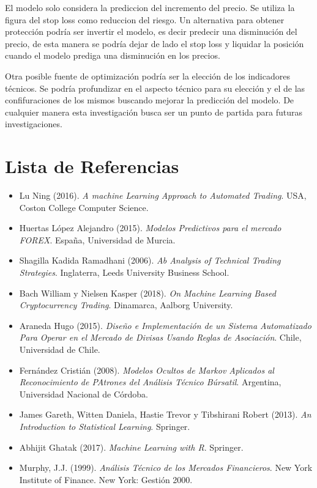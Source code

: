 \documentclass[a4paper,12pt]{Latex/Classes/PhDthesisPSnPDF}
\begin{document}
El modelo solo considera la prediccion del incremento del precio. Se utiliza la figura del stop loss como reduccion del riesgo. Un alternativa para obtener protección podría ser invertir el modelo, es decir predecir una disminución del precio, de esta manera se podría dejar de lado el stop loss y liquidar la posición cuando el modelo prediga una disminución en los precios.

Otra posible fuente de optimización podría ser la elección de los indicadores técnicos. Se podría profundizar en el aspecto técnico para su elección y el de las confifuraciones de los mismos buscando mejorar la predicción del modelo. De cualquier manera esta investigación busca ser un punto de partida para futuras investigaciones.



\chapter*{Lista de Referencias}

\begin{itemize}

\item Lu Ning (2016). \textit{A machine Learning Approach to Automated Trading}. USA, Coston College Computer Science.

\item Huertas López Alejandro (2015). \textit{Modelos Predictivos para el mercado FOREX}. España, Universidad de Murcia.

\item Shagilla Kadida Ramadhani (2006). \textit{Ab Analysis of Technical Trading Strategies}. Inglaterra, Leeds University Business School.

\item Bach William y Nielsen Kasper (2018). \textit{On Machine Learning Based Cryptocurrency Trading}. Dinamarca, Aalborg University.

\item Araneda Hugo (2015). \textit{Diseño e Implementación de un Sistema Automatizado Para Operar en el Mercado de Divisas Usando Reglas de Asociación}. Chile, Universidad de Chile.

\item Fernández Cristián (2008). \textit{Modelos Ocultos de Markov Aplicados al Reconocimiento de PAtrones del Análisis Técnico Búrsatil}. Argentina, Universidad Nacional de Córdoba.

\item James Gareth, Witten Daniela, Hastie Trevor y Tibshirani Robert (2013). \textit{An Introduction to Statistical Learning}. Springer.

\item Abhijit Ghatak (2017). \textit{Machine Learning with R}. Springer.

\item Murphy, J.J. (1999). \textit{Análisis Técnico de los Mercados Financieros}. New York Institute of Finance. New York: Gestión 2000.

\end{itemize}
\end{document}
